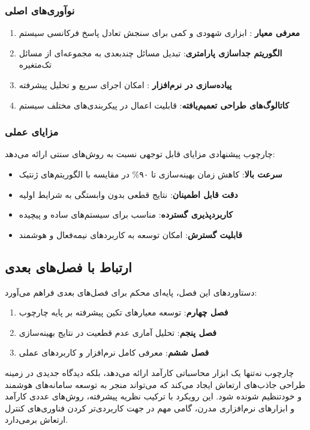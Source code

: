 \subsubsection{نوآوری‌های اصلی}
\begin{enumerate}
    \item \textbf{معرفی معیار }: ابزاری شهودی و کمی برای سنجش تعادل پاسخ فرکانسی سیستم
    \item \textbf{الگوریتم جداسازی پارامتری}: تبدیل مسائل چندبعدی به مجموعه‌ای از مسائل تک‌متغیره
    \item \textbf{پیاده‌سازی در نرم‌افزار }: امکان اجرای سریع و تحلیل پیشرفته
    \item \textbf{کاتالوگ‌های طراحی تعمیم‌یافته}: قابلیت اعمال در پیکربندی‌های مختلف سیستم
\end{enumerate}

\subsubsection{مزایای عملی}
چارچوب پیشنهادی  مزایای قابل توجهی نسبت به روش‌های سنتی ارائه می‌دهد:
\begin{itemize}
    \item \textbf{سرعت بالا}: کاهش زمان بهینه‌سازی تا ۹۰\% در مقایسه با الگوریتم‌های ژنتیک
    \item \textbf{دقت قابل اطمینان}: نتایج قطعی بدون وابستگی به شرایط اولیه
    \item \textbf{کاربردپذیری گسترده}: مناسب برای سیستم‌های ساده و پیچیده
    \item \textbf{قابلیت گسترش}: امکان توسعه به کاربردهای نیمه‌فعال و هوشمند
\end{itemize}

\subsection{ارتباط با فصل‌های بعدی}

دستاوردهای این فصل، پایه‌ای محکم برای فصل‌های بعدی فراهم می‌آورد:
\begin{enumerate}
    \item \textbf{فصل چهارم}: توسعه معیارهای تکین پیشرفته بر پایه چارچوب 
    \item \textbf{فصل پنجم}: تحلیل آماری عدم قطعیت در نتایج بهینه‌سازی
    \item \textbf{فصل ششم}: معرفی کامل نرم‌افزار  و کاربردهای عملی
\end{enumerate}

چارچوب  نه‌تنها یک ابزار محاسباتی کارآمد ارائه می‌دهد، بلکه دیدگاه جدیدی در زمینه طراحی جاذب‌های ارتعاش ایجاد می‌کند که می‌تواند منجر به توسعه سامانه‌های هوشمند و خودتنظیم شونده شود. این رویکرد با ترکیب نظریه پیشرفته، روش‌های عددی کارآمد و ابزارهای نرم‌افزاری مدرن، گامی مهم در جهت کاربردی‌تر کردن فناوری‌های کنترل ارتعاش برمی‌دارد.

